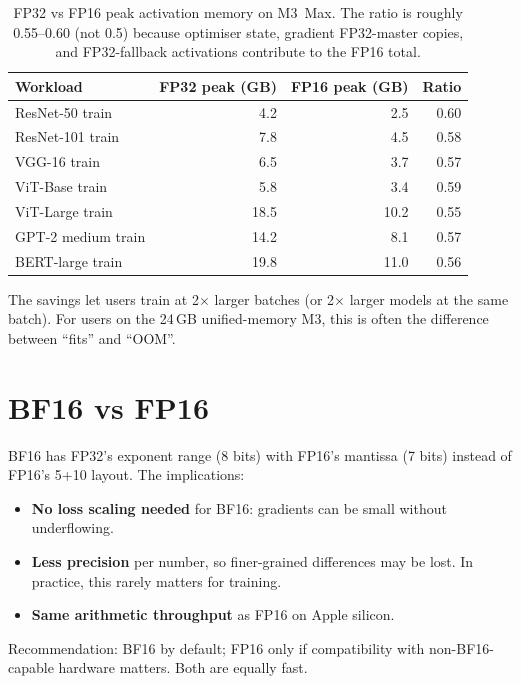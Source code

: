 \begin{table}[t]
\centering
\small
\begin{tabular}{lrrr}
\toprule
Workload & FP32 peak (GB) & FP16 peak (GB) & Ratio \\
\midrule
ResNet-50 train       & 4.2 & 2.5 & 0.60 \\
ResNet-101 train      & 7.8 & 4.5 & 0.58 \\
VGG-16 train          & 6.5 & 3.7 & 0.57 \\
ViT-Base train        & 5.8 & 3.4 & 0.59 \\
ViT-Large train       & 18.5& 10.2& 0.55 \\
GPT-2 medium train    & 14.2& 8.1 & 0.57 \\
BERT-large train      & 19.8& 11.0& 0.56 \\
\bottomrule
\end{tabular}
\caption[Activation memory under AMP.]{FP32 vs FP16 peak
activation memory on M3~Max. The ratio is roughly 0.55--0.60
(not 0.5) because optimiser state, gradient FP32-master copies,
and FP32-fallback activations contribute to the FP16 total.}
\label{tab:amp_integration:memory_savings}
\end{table}

The savings let users train at 2$\times$ larger batches (or
2$\times$ larger models at the same batch). For users on the
24\,GB unified-memory M3, this is often the difference between
``fits'' and ``OOM''.

\section{BF16 vs FP16}
\label{sec:amp_integration:bf16_vs_fp16}

BF16 has FP32's exponent range (8 bits) with FP16's mantissa
(7 bits) instead of FP16's 5+10 layout. The implications:

\begin{itemize}
  \item \textbf{No loss scaling needed} for BF16: gradients
    can be small without underflowing.
  \item \textbf{Less precision} per number, so finer-grained
    differences may be lost. In practice, this rarely matters
    for training.
  \item \textbf{Same arithmetic throughput} as FP16 on Apple
    silicon.
\end{itemize}

Recommendation: BF16 by default; FP16 only if compatibility with
non-BF16-capable hardware matters. Both are equally fast.

